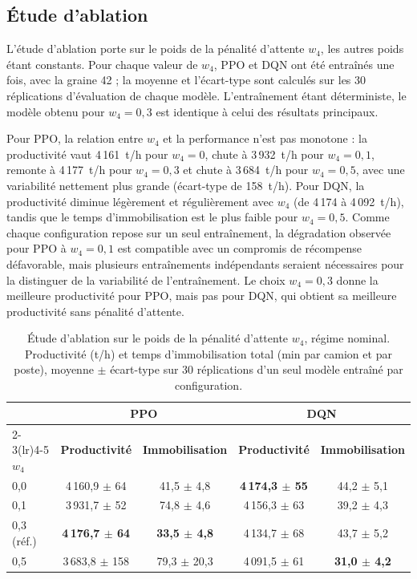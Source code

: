 \documentclass[11pt,a4paper]{article}
\newif\ifrevmarks
\newcommand{\revtag}[1]{\ifrevmarks\textsuperscript{\textcolor{red!70!black}{\scriptsize[#1]}}\fi}
\newcommand{\rev}[2]{\ifrevmarks{\color{revcolor}#2}\revtag{#1}\else#2\fi}
\newenvironment{revbloc}[1]{\par\ifrevmarks\color{revcolor}\noindent\revtag{#1}\ \fi}{\par}
\newcommand{\aexp}[1]{\ifrevmarks\textcolor{orange!85!black}{\textbf{[EXPÉRIENCE À FAIRE : #1]}}\fi}
\begin{document}
\aexp{tracer les courbes de convergence en moyenne $\pm$ intervalle sur 5 graines d'entraînement (M7, Dir. plan).}

\subsection{Étude d'ablation}
\label{sec:ablation}

\begin{revbloc}{M13, A}
L'étude d'ablation porte sur le poids de la pénalité d'attente $w_4$, les autres poids étant constants. Pour chaque valeur de $w_4$, PPO et DQN ont été entraînés une fois, avec la graine 42 ; la moyenne et l'écart-type sont calculés sur les 30 réplications d'évaluation de chaque modèle. L'entraînement étant déterministe, le modèle obtenu pour $w_4 = 0{,}3$ est identique à celui des résultats principaux.

Pour PPO, la relation entre $w_4$ et la performance n'est pas monotone : la productivité vaut 4\,161~t/h pour $w_4 = 0$, chute à 3\,932~t/h pour $w_4 = 0{,}1$, remonte à 4\,177~t/h pour $w_4 = 0{,}3$ et chute à 3\,684~t/h pour $w_4 = 0{,}5$, avec une variabilité nettement plus grande (écart-type de 158~t/h). Pour DQN, la productivité diminue légèrement et régulièrement avec $w_4$ (de 4\,174 à 4\,092~t/h), tandis que le temps d'immobilisation est le plus faible pour $w_4 = 0{,}5$. Comme chaque configuration repose sur un seul entraînement, la dégradation observée pour PPO à $w_4 = 0{,}1$ est compatible avec un compromis de récompense défavorable, mais plusieurs entraînements indépendants seraient nécessaires pour la distinguer de la variabilité de l'entraînement. Le choix $w_4 = 0{,}3$ donne la meilleure productivité pour PPO, mais pas pour DQN, qui obtient sa meilleure productivité sans pénalité d'attente.
\end{revbloc}

\begin{table}[H]
\centering
\caption{\rev{M13}{Étude d'ablation sur le poids de la pénalité d'attente $w_4$, régime nominal. Productivité (t/h) et temps d'immobilisation total (min par camion et par poste), moyenne $\pm$ écart-type sur 30 réplications d'un seul modèle entraîné par configuration.}}
\label{tab:ablation}
\small
\begin{tabular}{lcccc}
\toprule
 & \multicolumn{2}{c}{\textbf{PPO}} & \multicolumn{2}{c}{\textbf{DQN}} \\
\cmidrule(lr){2-3}\cmidrule(lr){4-5}
\textbf{$w_4$} & \textbf{Productivité} & \textbf{Immobilisation} & \textbf{Productivité} & \textbf{Immobilisation} \\
\midrule
0,0  & 4\,160,9 $\pm$ 64 & 41,5 $\pm$ 4,8 & \textbf{4\,174,3 $\pm$ 55} & 44,2 $\pm$ 5,1 \\
0,1  & 3\,931,7 $\pm$ 52 & 74,8 $\pm$ 4,6 & 4\,156,3 $\pm$ 63 & 39,2 $\pm$ 4,3 \\
0,3 (réf.) & \textbf{4\,176,7 $\pm$ 64} & \textbf{33,5 $\pm$ 4,8} & 4\,134,7 $\pm$ 68 & 43,7 $\pm$ 5,2 \\
0,5  & 3\,683,8 $\pm$ 158 & 79,3 $\pm$ 20,3 & 4\,091,5 $\pm$ 61 & \textbf{31,0 $\pm$ 4,2} \\
\bottomrule
\end{tabular}
\end{table}
\end{document}
